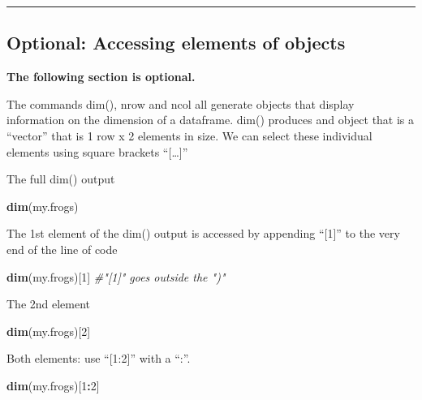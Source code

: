\documentclass[]{book}
\newenvironment{Shaded}{\begin{snugshade}}{\end{snugshade}}
\newcommand{\KeywordTok}[1]{\textcolor[rgb]{0.13,0.29,0.53}{\textbf{#1}}}
\newcommand{\DecValTok}[1]{\textcolor[rgb]{0.00,0.00,0.81}{#1}}
\newcommand{\CommentTok}[1]{\textcolor[rgb]{0.56,0.35,0.01}{\textit{#1}}}
\newcommand{\OperatorTok}[1]{\textcolor[rgb]{0.81,0.36,0.00}{\textbf{#1}}}
\newcommand{\NormalTok}[1]{#1}
\theoremstyle{definition}
\theoremstyle{definition}
\theoremstyle{definition}
\theoremstyle{remark}
\begin{document}
\begin{center}\rule{0.5\linewidth}{\linethickness}\end{center}

\subsection{Optional: Accessing elements of
objects}\label{optional-accessing-elements-of-objects}

\textbf{The following section is optional.}

The commands dim(), nrow and ncol all generate objects that display
information on the dimension of a dataframe. dim() produces and object
that is a ``vector'' that is 1 row x 2 elements in size. We can select
these individual elements using square brackets ``{[}\ldots{}{]}''

The full dim() output

\begin{Shaded}
\begin{Highlighting}[]
\KeywordTok{dim}\NormalTok{(my.frogs)}
\end{Highlighting}
\end{Shaded}

The 1st element of the dim() output is accessed by appending ``{[}1{]}''
to the very end of the line of code

\begin{Shaded}
\begin{Highlighting}[]
\KeywordTok{dim}\NormalTok{(my.frogs)[}\DecValTok{1}\NormalTok{] }\CommentTok{#"[1]" goes outside the ")"}
\end{Highlighting}
\end{Shaded}

The 2nd element

\begin{Shaded}
\begin{Highlighting}[]
\KeywordTok{dim}\NormalTok{(my.frogs)[}\DecValTok{2}\NormalTok{]}
\end{Highlighting}
\end{Shaded}

Both elements: use ``{[}1:2{]}'' with a ``:''.

\begin{Shaded}
\begin{Highlighting}[]
\KeywordTok{dim}\NormalTok{(my.frogs)[}\DecValTok{1}\OperatorTok{:}\DecValTok{2}\NormalTok{]}
\end{Highlighting}
\end{Shaded}
\end{document}
